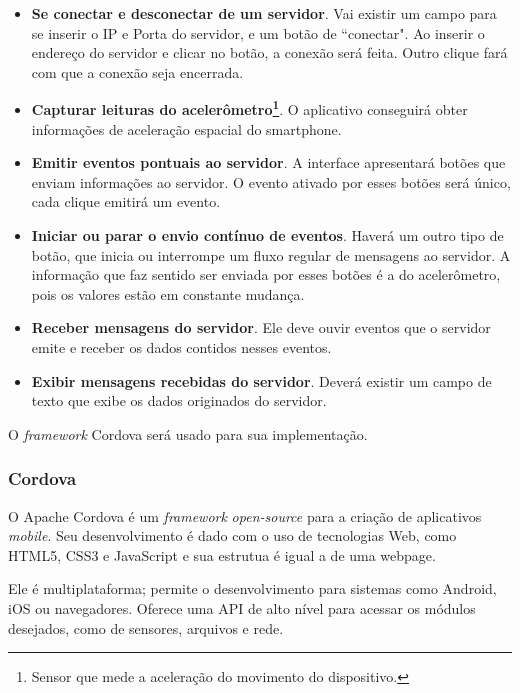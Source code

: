\documentclass[a4paper,12pt]{article}
\begin{document}
\begin{itemize}

  \item \textbf{Se conectar e desconectar de um servidor}. Vai existir um campo para se inserir o IP e Porta do servidor, e um botão de “conectar". Ao inserir o endereço do servidor e clicar no botão, a conexão será feita. Outro clique fará com que a conexão seja encerrada.

  \item \textbf{Capturar leituras do acelerômetro\footnote{Sensor que mede a aceleração do movimento do dispositivo.}}. O aplicativo conseguirá obter informações de aceleração espacial do smartphone.

  \item \textbf{Emitir eventos pontuais ao servidor}. A interface apresentará botões que enviam informações ao servidor. O evento ativado por esses botões será único, cada clique emitirá um evento.

  \item \textbf{Iniciar ou parar o envio contínuo de eventos}. Haverá um outro tipo de botão, que inicia ou interrompe um fluxo regular de mensagens ao servidor. A informação que faz sentido ser enviada por esses botões é a do acelerômetro, pois os valores estão em constante mudança.

  \item \textbf{Receber mensagens do servidor}. Ele deve ouvir eventos que o servidor emite e receber os dados contidos nesses eventos.

  \item \textbf{Exibir mensagens recebidas do servidor}. Deverá existir um campo de texto que exibe os dados originados do servidor.

\end{itemize}


O \emph{framework} Cordova será usado para sua implementação.

\subsubsection{Cordova}

O Apache Cordova é um \emph{framework} \emph{open-source} para a criação de aplicativos \emph{mobile}. Seu desenvolvimento é dado com o uso de tecnologias Web, como HTML5, CSS3 e JavaScript e sua estrutua é igual a de uma webpage.

Ele é multiplataforma; permite o desenvolvimento para sistemas como Android, iOS ou navegadores. Oferece uma API de alto nível para acessar os módulos desejados, como de sensores, arquivos e rede.
\end{document}
